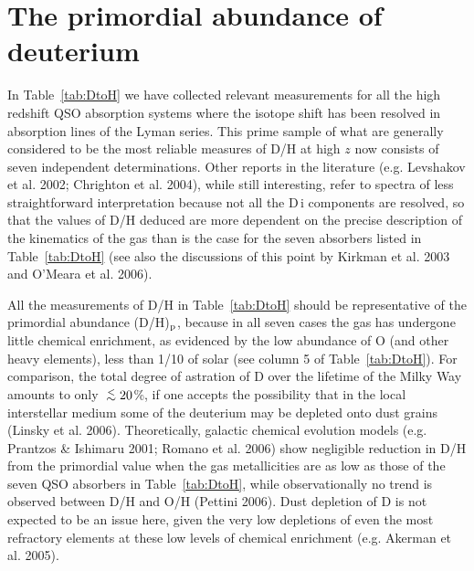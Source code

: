 \documentclass[useAMS,usenatbib]{mn2e}
\begin{document}
\section{The primordial abundance of deuterium}
\label{sec:D_abund_prim}


In Table~\ref{tab:DtoH} we have collected relevant measurements
for all the high redshift QSO absorption systems
where the isotope shift has been resolved
in absorption lines of the Lyman series.
This prime sample of what are generally considered
to be the most reliable measures of D/H at high $z$
now consists of seven independent determinations.
Other reports in the literature (e.g. Levshakov et al. 2002;
Chrighton et al. 2004), while still interesting, refer to
spectra of less straightforward interpretation because not all
the D\,{\sc i} components are resolved, so that
the values of D/H deduced are more dependent on
the precise description of the kinematics of the gas
than is the case for the seven absorbers listed in Table~\ref{tab:DtoH}
(see also the discussions of this point by Kirkman et al. 2003
and O'Meara et al. 2006).

All the measurements of D/H in Table~\ref{tab:DtoH}
should be representative
of the primordial abundance (D/H)$_{\rm p}$, because
in all seven cases the gas has undergone
little chemical enrichment, as evidenced by the low
abundance of O (and other heavy elements),  less
than 1/10 of solar (see column 5 of Table~\ref{tab:DtoH}).
For comparison, the total degree of astration of D over the
lifetime of the
Milky Way amounts to only
$\simlt 20$\%,  if one accepts the possibility
that in the local interstellar medium some
of the deuterium may be depleted onto dust grains
(Linsky et al. 2006).
Theoretically, galactic chemical evolution models
(e.g. Prantzos \& Ishimaru 2001; Romano et al. 2006)
show negligible reduction in D/H from the primordial
value when the gas metallicities are as low as those of
the seven QSO absorbers in Table~\ref{tab:DtoH},
while observationally no trend is observed between
D/H and O/H (Pettini 2006). Dust depletion of D
is not expected to be an issue here, given the very low
depletions of even the most refractory elements
at these low  levels of chemical enrichment (e.g. Akerman et al. 2005).
\end{document}
